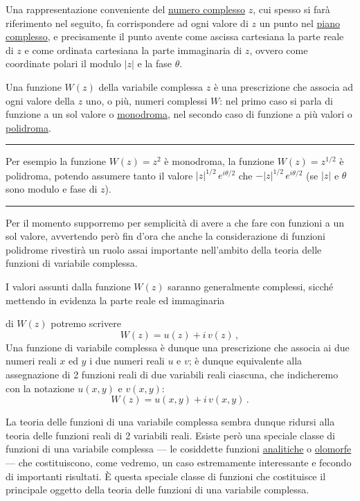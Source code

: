 \documentclass[11pt, a4paper]{book}
\numberwithin{equation}{section}
\begin{document}
Una rappresentazione conveniente del \underline{numero complesso} $z$, cui spesso si farà riferimento nel seguito, fa corrispondere ad ogni valore di $z$ un punto nel \underline{piano complesso}, e precisamente il punto avente come ascissa cartesiana la parte reale di $z$ e come ordinata cartesiana la parte immaginaria di $z$, ovvero come coordinate polari il modulo $|z|$ e la fase $\theta$.

Una funzione $W(z)$ della variabile complessa $z$ è una prescrizione che associa ad ogni valore della $z$ uno, o più, numeri complessi $W$: nel primo caso si parla di funzione a un sol valore o \underline{monodroma}, nel secondo caso di funzione a più valori o \underline{polidroma}.

\noindent\rule{\linewidth}{0.4pt}

Per esempio la funzione $W(z) = z^2$ è monodroma, la funzione $W(z) = z^{1/2}$ è polidroma, potendo assumere tanto il valore $|z|^{1/2}\,e^{i\theta/2}$ che $-|z|^{1/2}\,e^{i\theta/2}$ (se $|z|$ e $\theta$ sono modulo e fase di $z$).

\noindent\rule{\linewidth}{0.4pt}

Per il momento supporremo per semplicità di avere a che fare con funzioni a un sol valore, avvertendo però fin d'ora che anche la considerazione di funzioni polidrome rivestirà un ruolo assai importante nell'ambito della teoria delle funzioni di variabile complessa.

I valori assunti dalla funzione $W(z)$ saranno generalmente complessi, sicché mettendo in evidenza la parte reale ed immaginaria


di $W(z)$ potremo scrivere
\begin{equation}
W(z) = u(z) + i\,v(z)\,, \tag{3a}
\end{equation}
Una funzione di variabile complessa è dunque una prescrizione che associa ai due numeri reali $x$ ed $y$ i due numeri reali $u$ e $v$; è dunque equivalente alla assegnazione di 2 funzioni reali di due variabili reali ciascuna, che indicheremo con la notazione $u(x,y)$ e $v(x,y)$:
\begin{equation}
W(z) = u(x,y) + i\,v(x,y)\,. \tag{3b}
\end{equation}

La teoria delle funzioni di una variabile complessa sembra dunque ridursi alla teoria delle funzioni reali di 2 variabili reali. Esiste però una speciale classe di funzioni di una variabile complessa --- le cosiddette funzioni \underline{analitiche} o \underline{olomorfe} --- che costituiscono, come vedremo, un caso estremamente interessante e fecondo di importanti risultati. È questa speciale classe di funzioni che costituisce il principale oggetto della teoria delle funzioni di una variabile complessa.
\end{document}
